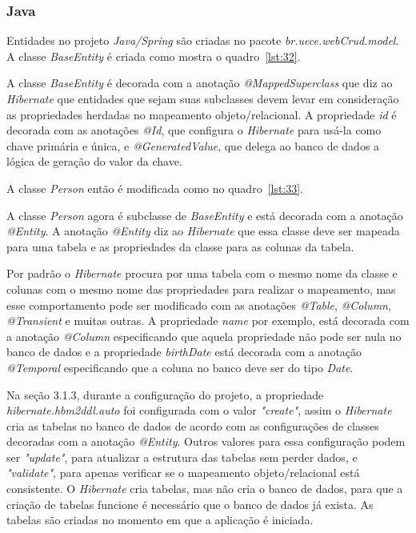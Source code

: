 \documentclass[a4paper,12pt]{article}
\newcommand{\est}[1] {
\textit{#1}}
\newcommand{\classe}[1] {
\textit{#1}}
\newcommand{\lang}[1] {
\textit{#1}}
\newcommand{\annotation}[1] {
\textit{#1}}
\newcommand{\pacote}[1] {
\textit{#1}}
\newcommand{\javacode}[3] {
	
}
\begin{document}
\subsubsection{Java}

Entidades no projeto \est{Java/Spring} são criadas no pacote \pacote{br.uece.webCrud.model}. A classe \classe{BaseEntity} é criada como mostra o quadro~\ref{lst:32}.

\javacode{code/32.txt}{Classe \classe{BaseEntity} no projeto \lang{Java}}{lst:32}

A classe \classe{BaseEntity} é decorada com a anotação \annotation{@MappedSuperclass} que diz ao \est{Hibernate} que entidades que sejam suas subclasses devem levar em consideração as propriedades herdadas no mapeamento objeto/relacional. A propriedade \est{id} é decorada com as anotações \annotation{@Id}, que configura o \est{Hibernate} para usá-la como chave primária e única, e \annotation{@GeneratedValue}, que delega ao banco de dados a lógica de geração do valor da chave.

A classe \classe{Person} então é modificada como no quadro~\ref{lst:33}.

\javacode{code/33.txt}{Classe \classe{Person} herda de \classe{BaseEntity}}{lst:33}

A classe \classe{Person} agora é subclasse de \classe{BaseEntity} e está decorada com a anotação \annotation{@Entity}. A anotação \annotation{@Entity} diz ao \est{Hibernate} que essa classe deve ser mapeada para uma tabela e as propriedades da classe para as colunas da tabela.

Por padrão o \est{Hibernate} procura por uma tabela com o mesmo nome da classe e colunas com o mesmo nome das propriedades para realizar o mapeamento, mas esse comportamento pode ser modificado com as anotações \annotation{@Table}, \annotation{@Column}, \annotation{@Transient} e muitas outras. A propriedade \est{name} por exemplo, está decorada com a anotação \annotation{@Column} especificando que aquela propriedade não pode ser nula no banco de dados e a propriedade \est{birthDate} está decorada com a anotação \annotation{@Temporal} especificando que a coluna no banco deve ser do tipo \classe{Date}.

Na seção 3.1.3, durante a configuração do projeto, a propriedade \est{hibernate.hbm2ddl.auto} foi configurada com o valor \est{"create"}, assim o \est{Hibernate} cria as tabelas no banco de dados de acordo com as configurações de classes decoradas com a anotação \annotation{@Entity}. Outros valores para essa configuração podem ser \est{"update"}, para atualizar a estrutura das tabelas sem perder dados, e \est{"validate"}, para apenas verificar se o mapeamento objeto/relacional está consistente. O \est{Hibernate} cria tabelas, mas não cria o banco de dados, para que a criação de tabelas funcione é necessário que o banco de dados já exista. As tabelas são criadas no momento em que a aplicação é iniciada.
\end{document}
